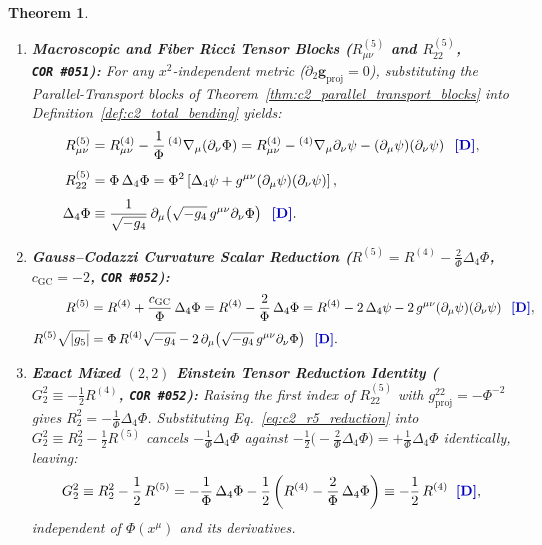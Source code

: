 \documentclass[11pt,a4paper]{article}
\newcommand{\catD}{\text{\textbf{\textcolor{blue!75!black}{[D]}}}}
\theoremstyle{definition}
\theoremstyle{plain}
\newtheorem{theorem}[axiom]{Theorem}
\theoremstyle{remark}
\begin{document}
\begin{theorem}
\begin{enumerate}[label=(\roman*)]
  \item \textbf{Macroscopic and Fiber Ricci Tensor Blocks ($R_{\mu\nu}^{(5)}$ and $R_{22}^{(5)}$, \texttt{COR~\#051}):}
  For any $x^2$-independent metric ($\partial_2 \mathbf{g}_{\mathrm{proj}} = 0$), substituting the Parallel-Transport blocks of Theorem~\ref{thm:c2_parallel_transport_blocks} into Definition~\ref{def:c2_total_bending} yields:
  \begin{align}
  R_{\mu\nu}^{(5)} &= R_{\mu\nu}^{(4)} - \frac{1}{\Phi}\,{}^{(4)}\nabla_\mu\!\left(\partial_\nu\Phi\right) = R_{\mu\nu}^{(4)} - {}^{(4)}\nabla_\mu\partial_\nu\psi - \left(\partial_\mu\psi\right)\!\left(\partial_\nu\psi\right) \;\;\catD, \label{eq:c2_ricci_munu} \\[4pt]
  R_{22}^{(5)} &= \Phi\,\Delta_4\Phi = \Phi^2\left[\Delta_4\psi + g^{\mu\nu}\!\left(\partial_\mu\psi\right)\!\left(\partial_\nu\psi\right)\right], \nonumber \\[3pt]
  \Delta_4\Phi &\equiv \frac{1}{\sqrt{-g_4}}\,\partial_\mu\!\left(\sqrt{-g_4}\,g^{\mu\nu}\partial_\nu\Phi\right) \;\;\catD. \label{eq:c2_ricci_22}
  \end{align}
  \item \textbf{Gauss--Codazzi Curvature Scalar Reduction ($R^{(5)} = R^{(4)} - \frac{2}{\Phi}\Delta_4\Phi$, $c_{\mathrm{GC}} = -2$, \texttt{COR~\#052}):}
  \begin{align}
  R^{(5)} &= R^{(4)} + \frac{c_{\mathrm{GC}}}{\Phi}\,\Delta_4\Phi = R^{(4)} - \frac{2}{\Phi}\,\Delta_4\Phi = R^{(4)} - 2\,\Delta_4\psi - 2\,g^{\mu\nu}\!\left(\partial_\mu\psi\right)\!\left(\partial_\nu\psi\right) \;\;\catD, \label{eq:c2_r5_reduction} \\[3pt]
  R^{(5)}\sqrt{|g_5|} &= \Phi\,R^{(4)}\sqrt{-g_4} - 2\,\partial_\mu\!\left(\sqrt{-g_4}\,g^{\mu\nu}\partial_\nu\Phi\right) \;\;\catD. \label{eq:c2_r5_volume_density}
  \end{align}
  \item \textbf{Exact Mixed $(2,2)$ Einstein Tensor Reduction Identity ($G^2_2 \equiv -\frac{1}{2}R^{(4)}$, \texttt{COR~\#052}):}
  Raising the first index of $R_{22}^{(5)}$ with $g^{22}_{\mathrm{proj}} = -\Phi^{-2}$ gives $R^2_2 = -\frac{1}{\Phi}\Delta_4\Phi$. Substituting Eq.~\eqref{eq:c2_r5_reduction} into $G^2_2 \equiv R^2_2 - \frac{1}{2}R^{(5)}$ cancels $-\frac{1}{\Phi}\Delta_4\Phi$ against $-\frac{1}{2}\big(-\frac{2}{\Phi}\Delta_4\Phi\big) = +\frac{1}{\Phi}\Delta_4\Phi$ identically, leaving:
  \begin{equation}\label{eq:c2_g22_mixed_identity}
  G^2_2 \equiv R^2_2 - \frac{1}{2}\,R^{(5)} = -\frac{1}{\Phi}\,\Delta_4\Phi - \frac{1}{2}\left(R^{(4)} - \frac{2}{\Phi}\,\Delta_4\Phi\right) \equiv -\frac{1}{2}\,R^{(4)} \;\;\catD,
  \end{equation}
  independent of $\Phi(x^\mu)$ and its derivatives.
\end{enumerate}
\end{theorem}
\end{document}
